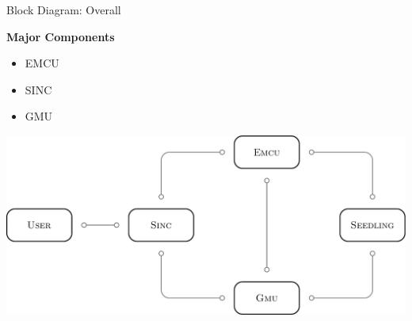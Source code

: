 \documentclass{beamer}
\begin{document}
\begin{frame} {Block Diagram: Overall}

    \begin{minipage} {0.29\textwidth}
        \textbf{Major Components}
        \vspace{0.25cm}
        \renewcommand\arraystretch{1.5}
        \begin{itemize}
            \item EMCU
            \item SINC
            \item GMU
        \end{itemize}
    \end{minipage}
    \begin{minipage} {0.7\textwidth}
        \begin{center}
            \includegraphics[width = \textwidth]{overall_block_diagram.pdf}
        \end{center}
    \end{minipage}


\end{frame}
\end{document}
